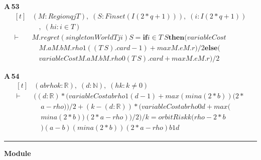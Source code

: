 \noindent\textbf{A\,53}\quad{}
{\footnotesize\[ \begin{aligned}[t]
&(\mathit{M} : \mathit{Region} \mathit{q} \mathit{j} \mathit{T}),\; (\mathit{S} : \mathit{Finset} (\mathit{I} (2*\mathit{q}+1))),\; (\mathit{i} : \mathit{I} (2*\mathit{q}+1))\\
&\quad ,\; (\mathit{hi} : \mathit{i} \in \mathit{T})\\
\vdash\;&\mathit{M}.\mathit{regret} (\mathit{singletonWorld} \mathit{T} \mathit{j} \mathit{i}) \mathit{S} = \mathbf{if} \mathit{i} \in \mathit{T} \ \mathit{S} \mathbf{then} (\mathit{variableCost}\\
&\quad \mathit{M}.\mathit{a} \mathit{M}.\mathit{b} \mathit{M}.\mathit{rho} 1 ((\mathit{T} \ \mathit{S}).\mathit{card}-1)+\mathit{max} \mathit{M}.\mathit{e} \mathit{M}.\mathit{r})/2 \mathbf{else} (\\
&\quad \mathit{variableCost} \mathit{M}.\mathit{a} \mathit{M}.\mathit{b} \mathit{M}.\mathit{rho} 0 (\mathit{T} \ \mathit{S}).\mathit{card}+\mathit{max} \mathit{M}.\mathit{e} \mathit{M}.\mathit{r})/2
\end{aligned} \]}

\noindent\textbf{A\,54}\quad{}
{\footnotesize\[ \begin{aligned}[t]
&(\mathit{a} \mathit{b} \mathit{rho} \mathit{k} : \mathbb{R} ),\; (\mathit{d} : \mathbb{N} ),\; (\mathit{hk} : \mathit{k} \neq 0)\\
\vdash\;&((\mathit{d}:\mathbb{R} )*(\mathit{variableCost} \mathit{a} \mathit{b} \mathit{rho} 1 (\mathit{d}-1)+\mathit{max} (\mathit{min} \mathit{a} (2*\mathit{b})) (2*\\
&\quad \mathit{a}-\mathit{rho}))/2+ (\mathit{k}-(\mathit{d}:\mathbb{R} ))*(\mathit{variableCost} \mathit{a} \mathit{b} \mathit{rho} 0 \mathit{d}+\mathit{max} (\\
&\quad \mathit{min} \mathit{a} (2*\mathit{b})) (2*\mathit{a}-\mathit{rho}))/2)/\mathit{k} = \mathit{orbitRisk} \mathit{k} (\mathit{rho}-2*\mathit{b}\\
&\quad ) (\mathit{a}-\mathit{b}) (\mathit{min} \mathit{a} (2*\mathit{b})) (2*\mathit{a}-\mathit{rho}) \mathit{b} 1 \mathit{d}
\end{aligned} \]}

\vspace{4pt}\noindent\rule{\columnwidth}{0.4pt}\par\vspace{2pt}
\noindent\textbf{Module }\par\vspace{3pt}

